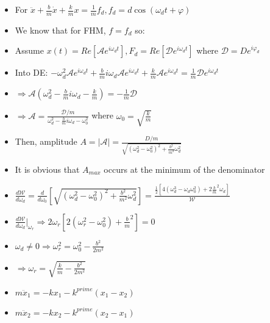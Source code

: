 \documentclass{article}
\begin{document}

\begin{itemize}
    \item For \(\ddot x + \frac{b}{m}\dot x + \frac{k}{m}x = \frac{1}{m}f_d, f_d = d\cos(\omega_d t+\varphi)\)
    \item We know that for FHM, \(f=f_d\) so:
    \item Assume \({x(t)=Re[\mathcal{A}e^{i\omega_d t}], F_d=Re[\mathcal{D}e^{i\omega_d t}]}\) where \(\mathcal{D} = De^{i\varphi_d}\)
    \item Into DE: \(-\omega_d^2\mathcal{A}e^{i\omega_d t} + \frac{b}{m}i\omega_d\mathcal{A}e^{i\omega_d t}+\frac{k}{m}\mathcal{A}e^{i\omega_d t}=\frac{1}{m}\mathcal{D}e^{i\omega_d t}\)
    \item \(\Rightarrow \mathcal{A}(\omega_d^2-\frac{b}{m}i\omega_d-\frac{k}{m})=-\frac{1}{m}\mathcal{D}\)
    \item \(\Rightarrow \mathcal{A}=\frac{\mathcal{D}/m}{\omega_d^2-\frac{b}{m}i\omega_d-\omega_0^2}\) where \(\omega_0=\sqrt{\frac{k}{m}}\)
    \item Then, amplitude \(A=|\mathcal{A}|=\frac{D/m}{\sqrt{(\omega_d^2-\omega_0^2)^2+\frac{b^2}{m^2}\omega_d^2}}\)
    \item It is obvious that \(A_{max}\) occurs at the minimum of the denominator
    \item \(\frac{d\mathcal{W}}{d\omega_d}=\frac{d}{d\omega_0}[\sqrt{(\omega_d^2-\omega_0^2)^2+\frac{b^2}{m^2}\omega_d^2}]=\frac{\frac{1}{2}[4(\omega_d^3-\omega_d\omega_0^2)+2\frac{b}{m}^2\omega_d]}{\mathcal{W}}\)
    \item \(\frac{d\mathcal{W}}{d\omega_d}\rvert_{\omega_r}\Rightarrow 2\omega_r[2(\omega_r^2-\omega_0^2)+\frac{b}{m}^2]=0\)
    \item \(\omega_d \not=0\Rightarrow\omega_r^2=\omega_0^2-\frac{b^2}{2m^2}\)
    \item \(\Rightarrow\boxed{\omega_r=\sqrt{\frac{k}{m}-\frac{b^2}{2m^2}}}\)
\end{itemize}

\begin{itemize}
    \item \(m\ddot x_1 = -kx_1 - k^{prime}(x_1-x_2)\)
    \item \(m\ddot x_2 = -kx_2 - k^{prime}(x_2-x_1)\)
\end{itemize}
\end{document}
